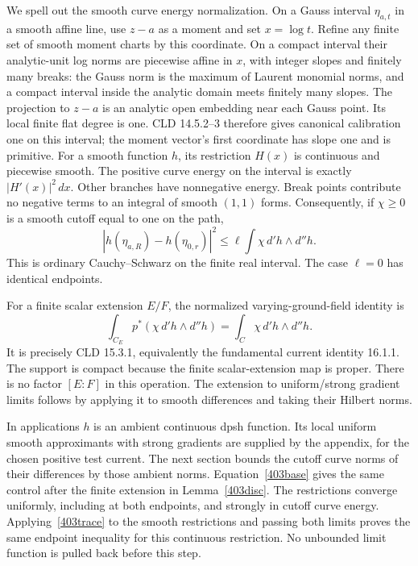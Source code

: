 \documentclass[11pt]{article}
\theoremstyle{remark}\newtheorem{remark}[theorem]{Remark}
\begin{document}
We spell out the smooth curve energy normalization. On a Gauss
interval $\eta_{a,t}$ in a smooth affine line, use $z-a$ as
a moment and set $x=\log t$. Refine any finite set of smooth
moment charts by this coordinate. On a compact interval their
analytic-unit log norms are piecewise affine in $x$, with
integer slopes and finitely many breaks: the Gauss norm is the
maximum of Laurent monomial norms, and a compact interval
inside the analytic domain meets finitely many slopes. The
projection to $z-a$ is an analytic open embedding near each
Gauss point. Its local finite flat degree is one. CLD 14.5.2--3
therefore gives canonical calibration one on this interval;
the moment vector's first coordinate has slope one and is
primitive. For a smooth function $h$, its restriction $H(x)$
is continuous and piecewise smooth. The positive curve energy
on the interval is exactly $|H'(x)|^2\,dx$. Other branches
have nonnegative energy. Break points contribute no negative
terms to an integral of smooth $(1,1)$ forms. Consequently,
if $\chi\ge0$ is a smooth cutoff equal to one on the path,
\begin{equation}\label{403trace}
|h(\eta_{a,R})-h(\eta_{0,r})|^2
\le\ell\int\chi\,d'h\wedge d''h.
\end{equation}
This is ordinary Cauchy--Schwarz on the finite real interval.
The case $\ell=0$ has identical endpoints.

For a finite scalar extension $E/F$, the normalized
varying-ground-field identity is
\begin{equation}\label{403base}
\int_{C_E}p^*(\chi\,d'h\wedge d''h)
=\int_C\chi\,d'h\wedge d''h.
\end{equation}
It is precisely CLD 15.3.1, equivalently the fundamental
current identity 16.1.1. The support is compact because the
finite scalar-extension map is proper. There is no factor
$[E:F]$ in this operation. The extension to uniform/strong
gradient limits follows by applying it to smooth differences
and taking their Hilbert norms.

In applications $h$ is an ambient continuous dpsh function.
Its local uniform smooth approximants with strong gradients
are supplied by the appendix, for the chosen positive test
current. The next section bounds the cutoff curve norms of
their differences by those ambient norms. Equation~\eqref{403base}
gives the same control after the finite extension in
Lemma~\ref{403disc}. The restrictions converge uniformly,
including at both endpoints, and strongly in cutoff curve
energy. Applying~\eqref{403trace} to the smooth restrictions
and passing both limits proves the same endpoint inequality
for this continuous restriction. No unbounded limit function
is pulled back before this step.
\end{document}
